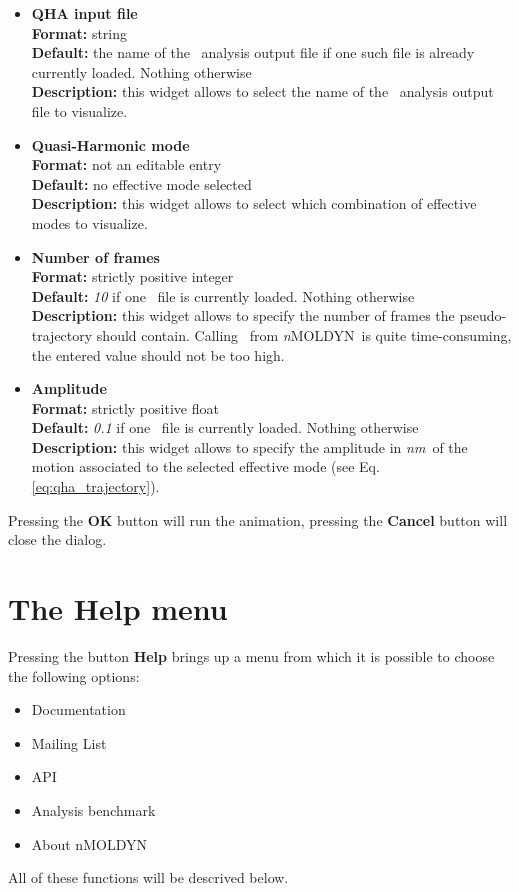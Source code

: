 \documentclass[a4paper,11pt]{report}
\newcommand{\nm}{\textit{nm}}
\newcommand{\NMOLDYN}{\textit{n}MOLDYN}
\begin{document}
\hypertarget{view_effective_modes_qha_input_file}{}
\begin{itemize}
\item \textbf{QHA input file}\\
\textbf{Format:} string\\
\textbf{Default:} the name of the \QHA\ analysis output file if one such file is already currently loaded. Nothing otherwise\\
\textbf{Description:} this widget allows to select the name of the \QHA\ analysis output file to visualize.

\hypertarget{view_effective_modes_quasi_harmonic_mode}{}
\item \textbf{Quasi-Harmonic mode}\\
\textbf{Format:} not an editable entry\\
\textbf{Default:} no effective mode selected\\
\textbf{Description:} this widget allows to select which combination of effective modes to visualize.

\hypertarget{view_effective_modes_number_of_frames}{}
\item \textbf{Number of frames}\\
\textbf{Format:} strictly positive integer\\
\textbf{Default:} \textit{10} if one \QHA\ file is currently loaded. Nothing otherwise\\
\textbf{Description:} this widget allows to specify the number of frames the pseudo-trajectory should contain.
Calling \VMD\ from \NMOLDYN\ is quite time-consuming, the entered value should not be too high.

\hypertarget{view_effective_modes_amplitude}{}
\item \textbf{Amplitude}\\
\textbf{Format:} strictly positive float\\
\textbf{Default:} \textit{0.1} if one \QHA\ file is currently loaded. Nothing otherwise\\
\textbf{Description:} this widget allows to specify the amplitude in \nm\ of the motion associated to the selected 
effective mode (see Eq. \ref{eq:qha_trajectory}).
\end{itemize}
Pressing the \textbf{OK} button will run the animation, pressing the \textbf{Cancel} button will close the dialog.

\section{The \textbf{Help} menu}
\label{help_menu}
Pressing the button \textbf{Help} brings up a menu from which it is possible to choose the following options:
\begin{itemize}
\item Documentation
\item Mailing List
\item API
\item Analysis benchmark
\item About nMOLDYN
\end{itemize}
All of these functions will be descrived below.
\end{document}
